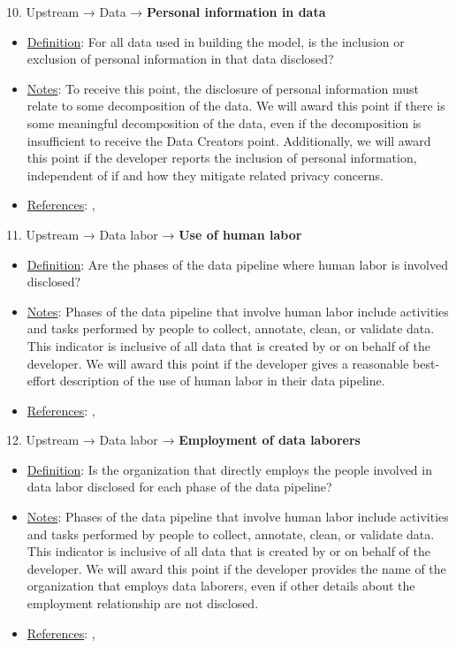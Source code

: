 10. Upstream → Data → \textbf{Personal information in data}
\vspace{-\parskip}
\begin{itemize}
\item
\underline{Definition}: For all data used in building the model, is the inclusion or exclusion of personal information in that data disclosed?
\item
\underline{Notes}: To receive this point, the disclosure of personal information must relate to some decomposition of the data. We will award this point if there is some meaningful decomposition of the data, even if the decomposition is insufficient to receive the Data Creators point. Additionally, we will award this point if the developer reports the inclusion of personal information, independent of if and how they mitigate related privacy concerns.
\item
\underline{References}: \citet{west2019data}, \citet{brown2022does}
\end{itemize} \vspace{\baselineskip}


11. Upstream → Data labor → \textbf{Use of human labor}
\vspace{-\parskip}
\begin{itemize}
\item
\underline{Definition}: Are the phases of the data pipeline where human labor is involved disclosed?
\item
\underline{Notes}: Phases of the data pipeline that involve human labor include activities and tasks performed by people to collect, annotate, clean, or validate data. This indicator is inclusive of all data that is created by or on behalf of the developer. We will award this point if the developer gives a reasonable best-effort description of the use of human labor in their data pipeline.
\item
\underline{References}: \citet{kittur2013future}, \citet{dzieza2023ai}
\end{itemize} \vspace{\baselineskip}


12. Upstream → Data labor → \textbf{Employment of data laborers}
\vspace{-\parskip}
\begin{itemize}
\item
\underline{Definition}: Is the organization that directly employs the people involved in data labor disclosed for each phase of the data pipeline?
\item
\underline{Notes}: Phases of the data pipeline that involve human labor include activities and tasks performed by people to collect, annotate, clean, or validate data. This indicator is inclusive of all data that is created by or on behalf of the developer. We will award this point if the developer provides the name of the organization that employs data laborers, even if other details about the employment relationship are not disclosed.
\item
\underline{References}: \citet{kittur2013future}, \citet{dzieza2023ai}
\end{itemize} \vspace{\baselineskip}


